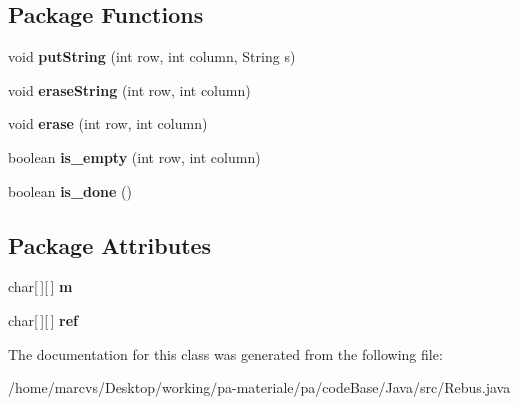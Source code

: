 \subsection*{Package Functions}
\begin{DoxyCompactItemize}
\item 
\hypertarget{classRebus_ae7febf865939cb84fc08a087d12ee465}{
void {\bfseries putString} (int row, int column, String s)}
\label{classRebus_ae7febf865939cb84fc08a087d12ee465}

\item 
\hypertarget{classRebus_a7f568be5d10645247a9c3b9c3aefd31b}{
void {\bfseries eraseString} (int row, int column)}
\label{classRebus_a7f568be5d10645247a9c3b9c3aefd31b}

\item 
\hypertarget{classRebus_a51b184a4ff31ffb8d696daf86b6027f9}{
void {\bfseries erase} (int row, int column)}
\label{classRebus_a51b184a4ff31ffb8d696daf86b6027f9}

\item 
\hypertarget{classRebus_ad429f688c0bd500988843f21426bca97}{
boolean {\bfseries is\_\-empty} (int row, int column)}
\label{classRebus_ad429f688c0bd500988843f21426bca97}

\item 
\hypertarget{classRebus_a75a4903e5f1d6ecb72c3689fda4422f3}{
boolean {\bfseries is\_\-done} ()}
\label{classRebus_a75a4903e5f1d6ecb72c3689fda4422f3}

\end{DoxyCompactItemize}
\subsection*{Package Attributes}
\begin{DoxyCompactItemize}
\item 
\hypertarget{classRebus_aa874c93e563860b32ee8d70bd15b66c7}{
char\mbox{[}$\,$\mbox{]}\mbox{[}$\,$\mbox{]} {\bfseries m}}
\label{classRebus_aa874c93e563860b32ee8d70bd15b66c7}

\item 
\hypertarget{classRebus_a3279788d9a6d47b8c7bc6857582d298c}{
char\mbox{[}$\,$\mbox{]}\mbox{[}$\,$\mbox{]} {\bfseries ref}}
\label{classRebus_a3279788d9a6d47b8c7bc6857582d298c}

\end{DoxyCompactItemize}


The documentation for this class was generated from the following file:\begin{DoxyCompactItemize}
\item 
/home/marcvs/Desktop/working/pa-\/materiale/pa/codeBase/Java/src/Rebus.java\end{DoxyCompactItemize}
